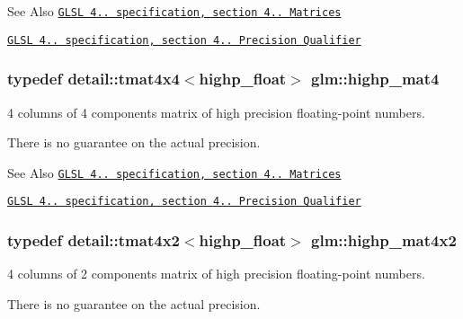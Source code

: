 \begin{DoxySeeAlso}{See Also}
\href{http://www.opengl.org/registry/doc/GLSLangSpec.4.20.8.pdf}{\tt G\-L\-S\-L 4.. specification, section 4.. Matrices} 

\href{http://www.opengl.org/registry/doc/GLSLangSpec.4.20.8.pdf}{\tt G\-L\-S\-L 4.. specification, section 4.. Precision Qualifier} 
\end{DoxySeeAlso}
\hypertarget{group__core__precision_gacab0d5de2ce45d2d2e08e4563a15377f}{
\subsubsection[{highp\-\_\-mat4}]{\setlength{\rightskip}{0pt plus 5cm}typedef detail\-::tmat4x4$<$highp\-\_\-float$>$ {\bf glm\-::highp\-\_\-mat4}}}\label{group__core__precision_gacab0d5de2ce45d2d2e08e4563a15377f}


4 columns of 4 components matrix of high precision floating-\/point numbers. 

There is no guarantee on the actual precision.

\begin{DoxySeeAlso}{See Also}
\href{http://www.opengl.org/registry/doc/GLSLangSpec.4.20.8.pdf}{\tt G\-L\-S\-L 4.. specification, section 4.. Matrices} 

\href{http://www.opengl.org/registry/doc/GLSLangSpec.4.20.8.pdf}{\tt G\-L\-S\-L 4.. specification, section 4.. Precision Qualifier} 
\end{DoxySeeAlso}
\hypertarget{group__core__precision_gaea696a76cb6e8c9b85ee9f0fd2e38a05}{
\subsubsection[{highp\-\_\-mat4x2}]{\setlength{\rightskip}{0pt plus 5cm}typedef detail\-::tmat4x2$<$highp\-\_\-float$>$ {\bf glm\-::highp\-\_\-mat4x2}}}\label{group__core__precision_gaea696a76cb6e8c9b85ee9f0fd2e38a05}


4 columns of 2 components matrix of high precision floating-\/point numbers. 

There is no guarantee on the actual precision.

